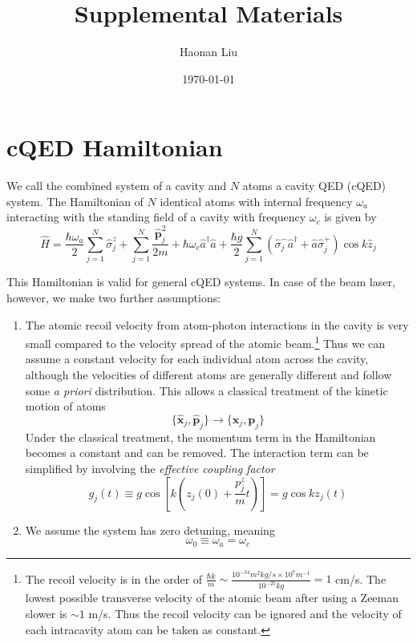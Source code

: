 \documentclass{article}
\title{Supplemental Materials}
\author{Haonan Liu}
\date{\today}
\newcommand{\omea}{\omega_a}
\newcommand{\omec}{\omega_c}
\newcommand{\szj}{\hat{\sigma}^z_j}
\newcommand{\spj}{\hat{\sigma}^+_j}
\newcommand{\smj}{\hat{\sigma}^-_j}
\begin{document}
\maketitle
\section{cQED Hamiltonian}
We call the combined system of a cavity and $N$ atoms a cavity QED (cQED) system. The Hamiltonian of $N$ identical atoms with internal frequency $\omea$ interacting with the standing field of a cavity with frequency $\omec$ is given by
\begin{equation}
\label{hamil_cqed}
    \hat{H} = \frac{\hbar \omea}{2}\sum^{N}_{j=1}\szj+\sum^{N}_{j=1}\frac{\hat{\textbf{p}}_j^2}{2m}+\hbar \omec \hat{a}^\dagger \hat{a}+\frac{\hbar g}{2}\sum^{N}_{j=1}\left(\smj \hat{a}^\dagger+\hat{a}\spj\right)\cos{k\hat{z}_j}
\end{equation}

This Hamiltonian is valid for general cQED systems. In case of the beam laser, however, we make two further assumptions:
\begin{enumerate}
    \item The atomic recoil velocity from atom-photon interactions in the cavity is very small compared to the velocity spread of the atomic beam.\footnote{The recoil velocity is in the order of $\frac{\hbar k}{m} \sim \frac{10^{-34}m^2kg/s\times10^{7}m^{-1}}{10^{-25}kg} = 1$ cm/s. The lowest possible transverse velocity of the atomic beam after using a Zeeman slower is $\sim 1$ m/s. Thus the recoil velocity can be ignored and the velocity of each intracavity atom can be taken as constant.} Thus we can assume a constant velocity for each individual atom across the cavity, although the velocities of different atoms are generally different and follow some \textit{a priori} distribution. This allows a classical treatment of the kinetic motion of atoms
    \begin{equation}
        \{\hat{\textbf{x}}_j,\hat{\textbf{p}}_j\} \rightarrow \{\textbf{x}_j,\textbf{p}_j\}
    \end{equation}
    Under the classical treatment, the momentum term in the Hamiltonian becomes a constant and can be removed. The interaction term can be simplified by involving the \textit{effective coupling factor}
    \begin{equation}
        g_j(t)  \equiv g\cos\left[k\left(z_j(0)+\frac{p^z_j}{m}t\right)\right] = g\cos k z_j(t)
    \end{equation}
    
    \item We assume the system has zero detuning, meaning
    \begin{equation}
        \omega_0 \equiv \omea = \omec
    \end{equation}
    
\end{enumerate}
\end{document}

